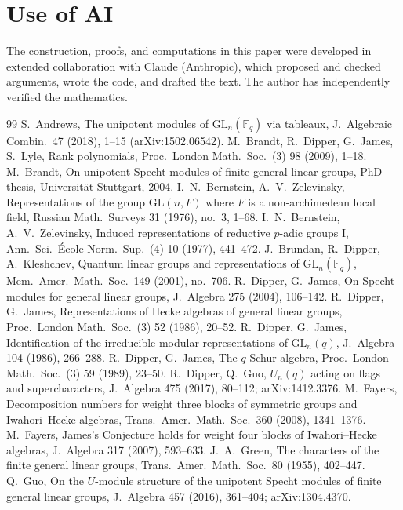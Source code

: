 \documentclass[11pt, letterpaper]{amsart}
\theoremstyle{definition}
\theoremstyle{remark}
\newcommand{\FF}{\mathbb{F}}
\newcommand{\GL}{\mathrm{GL}}
\begin{document}
\section*{Use of AI}
The construction, proofs, and computations in this paper were developed in extended collaboration with Claude (Anthropic), which proposed and checked arguments, wrote the code, and drafted the text. The author has independently verified the mathematics.

\begin{thebibliography}{99}
 S.\ Andrews, The unipotent modules of $\GL_n(\FF_q)$ via tableaux, J.\ Algebraic Combin.\ 47 (2018), 1--15 (arXiv:1502.06542).
 M.\ Brandt, R.\ Dipper, G.\ James, S.\ Lyle, Rank polynomials, Proc.\ London Math.\ Soc.\ (3) 98 (2009), 1--18.
 M.\ Brandt, On unipotent Specht modules of finite general linear groups, PhD thesis, Universit\"at Stuttgart, 2004.
 I.\ N.\ Bernstein, A.\ V.\ Zelevinsky, Representations of the group $\GL(n,F)$ where $F$ is a non-archimedean local field, Russian Math.\ Surveys 31 (1976), no.~3, 1--68.
 I.\ N.\ Bernstein, A.\ V.\ Zelevinsky, Induced representations of reductive $p$-adic groups I, Ann.\ Sci.\ \'Ecole Norm.\ Sup.\ (4) 10 (1977), 441--472.
 J.\ Brundan, R.\ Dipper, A.\ Kleshchev, Quantum linear groups and representations of $\GL_n(\FF_q)$, Mem.\ Amer.\ Math.\ Soc.\ 149 (2001), no.~706.
 R.\ Dipper, G.\ James, On Specht modules for general linear groups, J.\ Algebra 275 (2004), 106--142.
 R.\ Dipper, G.\ James, Representations of Hecke algebras of general linear groups, Proc.\ London Math.\ Soc.\ (3) 52 (1986), 20--52.
 R.\ Dipper, G.\ James, Identification of the irreducible modular representations of $\GL_n(q)$, J.\ Algebra 104 (1986), 266--288.
 R.\ Dipper, G.\ James, The $q$-Schur algebra, Proc.\ London Math.\ Soc.\ (3) 59 (1989), 23--50.
 R.\ Dipper, Q.\ Guo, $U_n(q)$ acting on flags and supercharacters, J.\ Algebra 475 (2017), 80--112; arXiv:1412.3376.
 M.\ Fayers, Decomposition numbers for weight three blocks of symmetric groups and Iwahori--Hecke algebras, Trans.\ Amer.\ Math.\ Soc.\ 360 (2008), 1341--1376.
 M.\ Fayers, James's Conjecture holds for weight four blocks of Iwahori--Hecke algebras, J.\ Algebra 317 (2007), 593--633.
 J.\ A.\ Green, The characters of the finite general linear groups, Trans.\ Amer.\ Math.\ Soc.\ 80 (1955), 402--447.
 Q.\ Guo, On the $U$-module structure of the unipotent Specht modules of finite general linear groups, J.\ Algebra 457 (2016), 361--404; arXiv:1304.4370.

\end{thebibliography}
\end{document}
